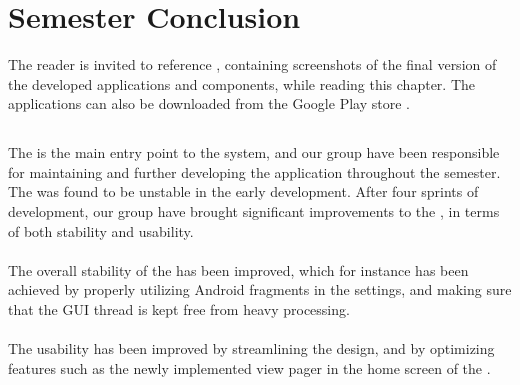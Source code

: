 \chapter{Semester Conclusion}
\label{cha:conclusion_final}

The reader is invited to reference , containing screenshots of the final version of the developed applications and components, while reading this chapter. The applications can also be downloaded from the Google Play store \parencite{giraf_google_play}.

\section*{\launcher}
The \launcher is the main entry point to the \giraf system, and our group have been responsible for maintaining and further developing the application throughout the semester. The \launcher was found to be unstable in the early development. After four sprints of development, our group have brought significant improvements to the \launcher, in terms of both stability and usability.
\\\\
The overall stability of the \launcher has been improved, which for instance has been achieved by properly utilizing Android fragments in the \launcher settings, and making sure that the GUI thread is kept free from heavy processing. 
\\\\
The usability has been improved by streamlining the design, and by optimizing features such as the newly implemented view pager in the home screen of the \launcher.

